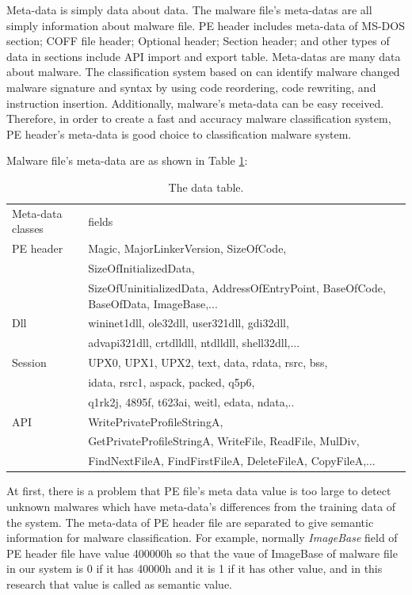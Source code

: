Meta-data is simply data about data. The malware file's meta-datas are all simply information about malware file. PE header includes meta-data of MS-DOS section; COFF file header; Optional header; Section header; and other types of data in sections include API import and export table. Meta-datas are many data about malware. The classification system based on can identify malware changed malware signature and syntax by using code reordering, code rewriting, and instruction insertion. Additionally, malware's meta-data can be easy received. Therefore, in order to create a fast and accuracy malware classification system, PE header's meta-data is good choice to classification malware system. 

Malware file's meta-data are as shown in Table \ref{table:metadata}:
\begin{table}
\begin{center}
    \begin{tabular}{ | l | l |}
     \hline
    Meta-data classes & fields \\
  PE header & Magic, MajorLinkerVersion, SizeOfCode,\\
  & SizeOfInitializedData, \\
 & SizeOfUninitializedData, AddressOfEntryPoint, BaseOfCode, BaseOfData, ImageBase,... \\ 
 \hline
	Dll &   wininet1dll, ole32dll, user321dll, gdi32dll,\\ 
	 & advapi321dll, crtdlldll, ntdlldll, shell32dll,...\\ 
	 \hline
	Session &  UPX0, UPX1, UPX2, text, data, rdata, rsrc, bss, \\
 & idata, rsrc1, aspack, packed, q5p6, \\
 & q1rk2j, 4895f, t623ai, weitl, edata, ndata,.. \\ 
 \hline
	API &  WritePrivateProfileStringA, \\
& GetPrivateProfileStringA, WriteFile, ReadFile, MulDiv,\\
& FindNextFileA, FindFirstFileA, DeleteFileA, CopyFileA,...\\  
 \hline
    \end{tabular}
	\end{center}
     \caption{The data table.}
    \label{table:metadata}
\end{table}

At first, there is a problem that PE file's meta data value is too large to detect unknown malwares which have meta-data's differences from the training data of the system. The meta-data of PE header file are separated  to give semantic information for malware classification. For example, normally \emph{ImageBase} field of PE header file have value 400000h \cite{goppit} so that the vaue of ImageBase of malware file in our system is 0 if it has 40000h and it is 1 if it has other value, and in this research that value is called as semantic value. 

